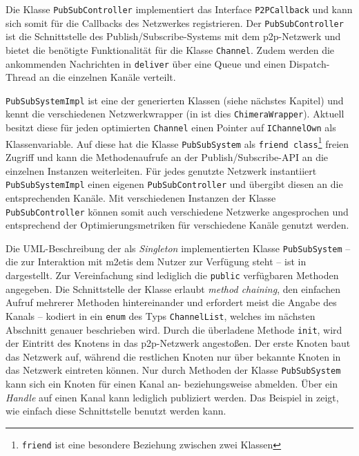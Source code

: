 

Die Klasse \texttt{PubSubController} implementiert das Interface \texttt{P2PCallback} und kann sich somit für die Callbacks des Netzwerkes registrieren. Der \texttt{PubSubController} ist die Schnittstelle des Publish/Subscribe-Systems mit dem \ac{p2p}-Netzwerk und bietet die benötigte Funktionalität für die Klasse \texttt{Channel}. Zudem werden die ankommenden Nachrichten in \texttt{deliver} über eine Queue und einen Dispatch-Thread an die einzelnen Kanäle verteilt. 

\texttt{PubSubSystemImpl} ist eine der generierten Klassen (siehe nächstes Kapitel) und kennt die verschiedenen Netzwerkwrapper (in  ist dies \texttt{ChimeraWrapper}). Aktuell besitzt diese für jeden optimierten \texttt{Channel} einen Pointer auf \texttt{IChannelOwn} als Klassenvariable. Auf diese hat die Klasse \texttt{PubSubSystem} als \texttt{friend class}\footnote{\texttt{friend} ist eine besondere Beziehung zwischen zwei Klassen} freien Zugriff und kann die Methodenaufrufe an der Publish/Subscribe-API an die einzelnen Instanzen weiterleiten. Für jedes genutzte Netzwerk instantiiert \texttt{PubSubSystemImpl} einen eigenen \texttt{PubSubController} und übergibt diesen an die entsprechenden Kanäle. Mit verschiedenen Instanzen der Klasse \texttt{PubSubController} können somit auch verschiedene Netzwerke angesprochen und entsprechend der Optimierungsmetriken für verschiedene Kanäle genutzt werden.

Die UML-Beschreibung der als \emph{Singleton} implementierten Klasse \texttt{PubSubSystem} -- die zur Interaktion mit \ac{m2etis} dem Nutzer zur Verfügung steht -- ist in  dargestellt. Zur Vereinfachung sind lediglich die \texttt{public} verfügbaren Methoden angegeben. Die Schnittstelle der Klasse erlaubt \emph{method chaining}, den einfachen Aufruf mehrerer Methoden hintereinander und erfordert meist die Angabe des Kanals -- kodiert in ein \texttt{enum} des Typs \texttt{ChannelList}, welches im nächsten Abschnitt genauer beschrieben wird.  Durch die überladene Methode \texttt{init}, wird der Eintritt des Knotens in das \ac{p2p}-Netzwerk angestoßen. Der erste Knoten baut das Netzwerk auf, während die restlichen Knoten nur über bekannte Knoten in das Netzwerk eintreten können. Nur durch Methoden der Klasse \texttt{PubSubSystem} kann sich ein Knoten für einen Kanal an- beziehungsweise abmelden. Über ein \emph{Handle} auf einen Kanal kann lediglich publiziert werden. Das Beispiel in  zeigt, wie einfach diese Schnittstelle benutzt werden kann.

